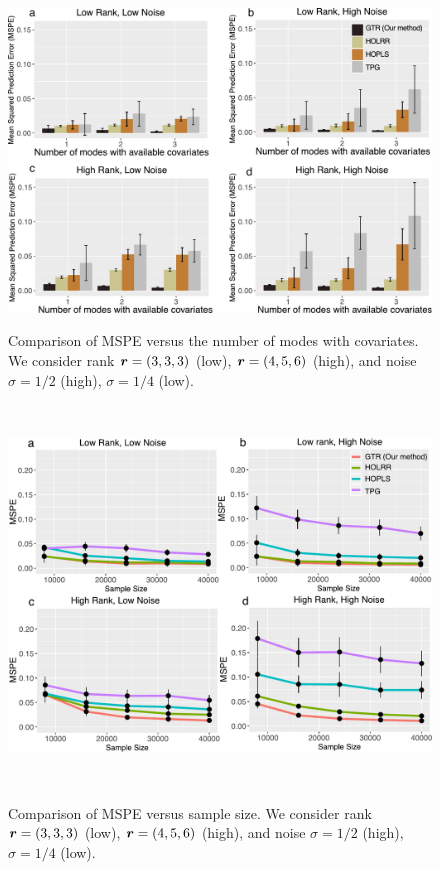 \documentclass{article}
\theoremstyle{plain}
\theoremstyle{definition}
\begin{document}
\begin{figure}[htbp]
\centering
\begin{minipage}[t]{0.46\textwidth}
\centering
\includegraphics[width=1\textwidth]{merge.pdf}
\caption{\normalsize{Comparison of MSPE versus the number of modes with covariates. We consider rank $\bm{r}=(3,3,3)$ (low), $\bm{r}=(4,5,6)$ (high), and noise $\sigma=1/2$ (high), $\sigma=1/4$ (low).}}~\label{fig:compare}
\end{minipage}
\hspace{.5cm}
\begin{minipage}[t]{0.46\textwidth}
\centering
\includegraphics[width=1\textwidth]{merge2.pdf}
\caption{\normalsize{Comparison of MSPE versus sample size. We consider rank $\bm{r}=(3,3,3)$ (low), $\bm{r}=(4,5,6)$ (high), and noise $\sigma=1/2$ (high), $\sigma=1/4$ (low). }}~\label{fig:compare2}
\end{minipage}
\vspace{-.5cm}
\end{figure}
\end{document}
